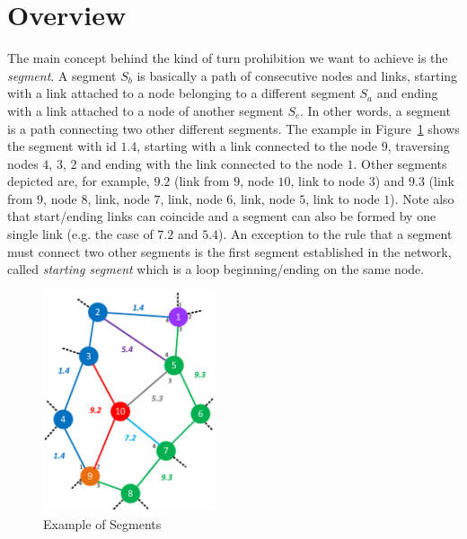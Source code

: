 
\section{\disr{} Overview}

\label{sec:disr_concepts}
The main concept behind the kind of turn prohibition we want to
achieve is the \emph{segment}. A segment $S_b$ is basically a path of consecutive
nodes and links, starting with a link attached to a node belonging to
a different segment $S_a$ and ending with a link attached to a
node of another segment $S_c$. In other words, a segment is
a path connecting two other different segments. The example
in Figure~\ref{fig:segments} shows the segment with id $1.4$, starting
with a link connected to the node $9$, traversing nodes
$4$, $3$, $2$ and ending with the link connected to the node $1$. Other
segments depicted are, for example, $9.2$ (link from $9$, node $10$, link to node $3$) and $9.3$
(link from $9$, node $8$, link, node $7$, link, node $6$, link, node $5$, link to node $1$). Note
also that start/ending links can coincide and a segment can also be
formed by one single link (e.g. the case of $7.2$ and $5.4$).
An exception to the rule that a segment must connect two other
segments is the first segment established in the network, called
\emph{starting segment} which is a loop beginning/ending on the same
node.

\begin{figure}
\centering
    \includegraphics[width=0.45\textwidth]{pictures/network_slice.eps}
  \caption{Example of Segments}
  \label{fig:segments}
\end{figure}

